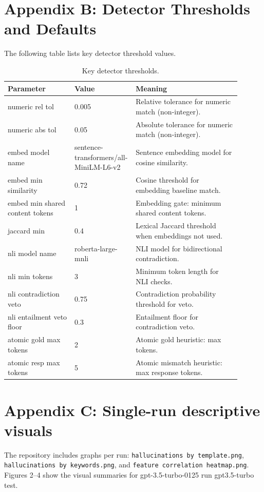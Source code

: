 \documentclass[11pt]{article}
\newcommand{\code}[1]{\texttt{#1}}
\begin{document}
\section*{Appendix B: Detector Thresholds and Defaults}
The following table lists key detector threshold values.
\begin{table}[H]
\centering
\small
\caption{Key detector thresholds.}
\label{tab:thresholds}
\begin{tabular}{p{0.28\linewidth}p{0.18\linewidth}p{0.44\linewidth}}
\toprule
Parameter & Value & Meaning\\
\midrule
numeric rel tol & 0.005 & Relative tolerance for numeric match (non-integer).\\
numeric abs tol & 0.05 & Absolute tolerance for numeric match (non-integer).\\
embed model name & sentence-transformers/all-MiniLM-L6-v2 & Sentence embedding model for cosine similarity.\\
embed min similarity & 0.72 & Cosine threshold for embedding baseline match.\\
embed min shared content tokens & 1 & Embedding gate: minimum shared content tokens.\\
jaccard min & 0.4 & Lexical Jaccard threshold when embeddings not used.\\
nli model name & roberta-large-mnli & NLI model for bidirectional contradiction.\\
nli min tokens & 3 & Minimum token length for NLI checks.\\
nli contradiction veto & 0.75 & Contradiction probability threshold for veto.\\
nli entailment veto floor & 0.3 & Entailment floor for contradiction veto.\\
atomic gold max tokens & 2 & Atomic gold heuristic: max tokens.\\
atomic resp max tokens & 5 & Atomic mismatch heuristic: max response tokens.\\
\bottomrule
\end{tabular}
\end{table}

\section*{Appendix C: Single-run descriptive visuals}
The repository includes graphs per run: \code{hallucinations by template.png}, \code{hallucinations by keywords.png}, and \code{feature correlation heatmap.png}. Figures 2--4 show the visual summaries for gpt-3.5-turbo-0125 run gpt3.5-turbo test.
\end{document}
